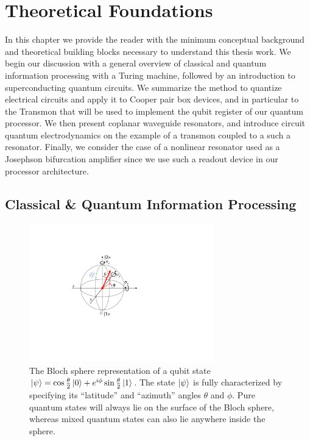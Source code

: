 \chapter{Theoretical Foundations} \label{chapter:theory}

In this chapter we provide the reader with the minimum conceptual background and theoretical building blocks necessary  to understand this thesis work. We begin our discussion with a general overview of classical and quantum information processing with a Turing machine, followed by an introduction to superconducting quantum circuits. We summarize the method to quantize electrical circuits and apply it to Cooper pair box devices, and in particular to the Transmon that will be used to implement the qubit register of our quantum processor. We then present coplanar waveguide resonators, and introduce circuit quantum electrodynamics on the example of a transmon coupled to a such a resonator. Finally, we consider the case of a nonlinear resonator used as a Josephson bifurcation amplifier since we use such a readout device in our processor architecture.

\section{Classical \& Quantum Information Processing}

\begin{figure}
	\includegraphics[width=8cm]{"./material/figures/introduction/bloch_sphere"}
	\caption{The Bloch sphere representation of a qubit state $\left| \psi \right> = \cos{\frac{\theta}{2}}\left| 0 \right>+e^{i\phi}\sin{\frac{\theta}{2}}\left| 1 \right>$. The state $\left| \psi \right>$ is fully characterized by specifying its ``latitude'' and ``azimuth'' angles $\theta$ and $\phi$. Pure quantum states will always lie on the surface of the Bloch sphere, whereas mixed quantum states can also lie anywhere inside the sphere.}
	\label{fig:BlochSphere}
\end{figure}

